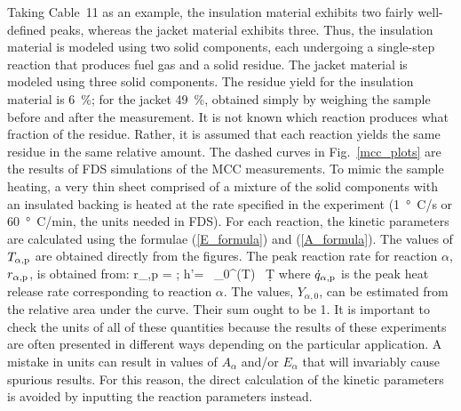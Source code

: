 \documentclass[11pt]{book}
\begin{document}
Taking Cable~11 as an example, the insulation material exhibits two fairly well-defined peaks, whereas the jacket material exhibits three. Thus, the insulation material is modeled using two solid components, each undergoing a single-step reaction that produces fuel gas and a solid residue. The jacket material is modeled using three solid components. The residue yield for the insulation material is 6~\%; for the jacket 49~\%, obtained simply by weighing the sample before and after the measurement. It is not known which reaction produces what fraction of the residue. Rather, it is assumed that each reaction yields the same residue in the same relative amount. The dashed curves in Fig.~\ref{mcc_plots} are the results of FDS simulations of the MCC measurements. To mimic the sample heating, a very thin sheet comprised of a mixture of the solid components with an insulated backing is heated at the rate specified in the experiment (1~\si{\degree C}/s or 60~\si{\degree C}/min, the units needed in FDS). For each reaction, the kinetic parameters are calculated using the formulae (\ref{E_formula}) and (\ref{A_formula}). The values of $T_{\alpha,{\rm p}}$ are obtained directly from the figures. The peak reaction rate for reaction $\alpha$, $r_{\alpha,{\rm p}}$, is obtained from:
\be
   r_{\alpha,{\rm p}} =    \quad ; \quad
   \Delta h'=  \, \int_0^\infty {}(T) \, \d T   \label{r_formula}
\ee
where $\dot{q}_{\alpha,{\rm p}}$ is the peak heat release rate corresponding to reaction $\alpha$. The values, $Y_{\alpha,0}$, can be estimated from the relative area under the curve. Their sum ought to be 1. It is important to check the units of all of these quantities because the results of these experiments are often presented in different ways depending on the particular application. A mistake in units can result in values of $A_\alpha$ and/or $E_\alpha$ that will invariably cause spurious results. For this reason, the direct calculation of the kinetic parameters is avoided by inputting the reaction parameters instead.
\end{document}
